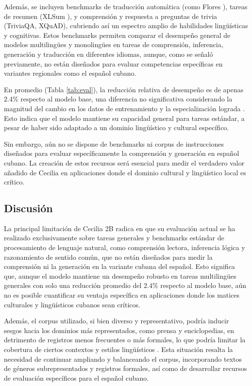 \documentclass[10pt,twoside]{rcmart} %
\begin{document}
Además, se incluyen benchmarks de traducción automática (como Flores \cite{goyal2022flores}), tareas de resumen (XLSum \cite{hasan2021xl}), y comprensión y respuesta a preguntas de trivia (TriviaQA\cite{joshi2017triviaqa}, XQuAD\cite{artetxe2019cross}), cubriendo así un espectro amplio de habilidades lingüísticas y cognitivas. Estos benchmarks permiten comparar el desempeño general de modelos multilingües y monolingües en tareas de comprensión, inferencia, generación y traducción en diferentes idiomas, aunque, como se señaló previamente, no están diseñados para evaluar competencias específicas en variantes regionales como el español cubano.

En promedio (Tabla \ref{tab:eval}), la reducción relativa de desempeño es de apenas $2.4\%$ respecto al modelo base, una diferencia no significativa considerando la magnitud del cambio en los datos de entrenamiento y la especialización lograda \cite{guo2023continuous}. Esto indica que el modelo mantiene su capacidad general para tareas estándar, a pesar de haber sido adaptado a un dominio lingüístico y cultural específico.

Sin embargo, aún no se dispone de benchmarks ni corpus de instrucciones diseñados para evaluar específicamente la comprensión y generación en español cubano. La creación de estos recursos será esencial para medir el verdadero valor añadido de Cecilia en aplicaciones donde el dominio cultural y lingüístico local es crítico.

\subsection{Discusión}

La principal limitación de Cecilia 2B radica en que su evaluación actual se ha realizado exclusivamente sobre tareas generales y benchmarks estándar de procesamiento de lenguaje natural, como comprensión lectora, inferencia lógica y razonamiento de sentido común, que no están diseñados para medir la comprensión ni la generación en la variante cubana del español. Esto significa que, aunque el modelo mantiene un desempeño robusto en tareas multilingües generales con solo una reducción promedio del $2.4\%$ respecto al modelo base, aún no es posible cuantificar su ventaja específica en aplicaciones donde los matices culturales y lingüísticos cubanos sean críticos.

Además, el corpus utilizado, si bien diverso y representativo, podría inducir sesgos hacia los dominios más representados, como prensa y enciclopedias, en detrimento de registros menos frecuentes o más formales, lo que podría limitar la cobertura de ciertos contextos y estilos lingüísticos \cite{cahyawijaya2025crowdsource}. Esta situación resalta la necesidad de continuar ampliando y balanceando el corpus, incorporando textos de géneros subrepresentados y registros formales, así como de desarrollar recursos de evaluación específicos para el español cubano.
\end{document}
